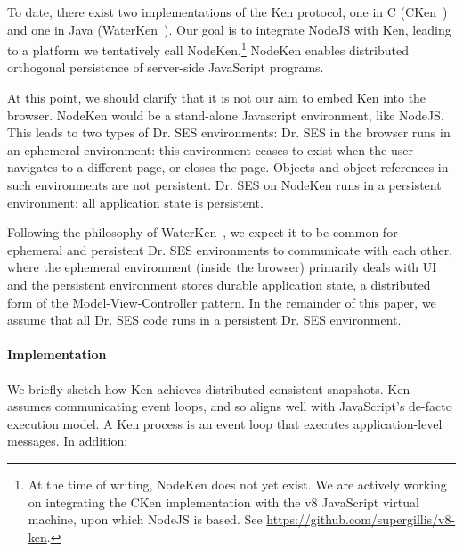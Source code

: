 \documentclass{llncs}
\begin{document}
To date, there exist two implementations of the Ken protocol, one in C (CKen~\cite{Yoo:CKen}) and one in Java (WaterKen~\cite{Close:Waterken}). Our goal is to integrate NodeJS with Ken, leading to a platform we tentatively call NodeKen.\footnote{
%
At the time of writing, NodeKen does not yet exist. We are actively working on integrating the CKen implementation with the v8 JavaScript virtual machine, upon which NodeJS is based. See \url{https://github.com/supergillis/v8-ken}.
%
} NodeKen enables distributed orthogonal persistence of server-side JavaScript programs.

At this point, we should clarify that it is not our aim to embed Ken into the browser. NodeKen would be a stand-alone Javascript environment, like NodeJS. This leads to two types of Dr. SES environments: Dr. SES in the browser runs in an ephemeral environment: this environment ceases to exist when the user navigates to a different page, or closes the page. Objects and object references in such environments are not persistent. Dr. SES on NodeKen runs in a persistent environment: all application state is persistent.

Following the philosophy of WaterKen~\cite{Close:Waterken}, we expect it to be common for ephemeral and persistent Dr. SES environments to communicate with each other, where the ephemeral environment (inside the browser) primarily deals with UI and the persistent environment stores durable application state, a distributed form of the Model-View-Controller pattern. In the remainder of this paper, we assume that all Dr. SES code runs in a persistent Dr. SES environment.

\paragraph{Implementation} 

We briefly sketch how Ken achieves distributed consistent snapshots. Ken assumes communicating event loops, and so aligns well with JavaScript's de-facto execution model. A Ken process is an event loop that executes application-level messages. In addition:
\end{document}
